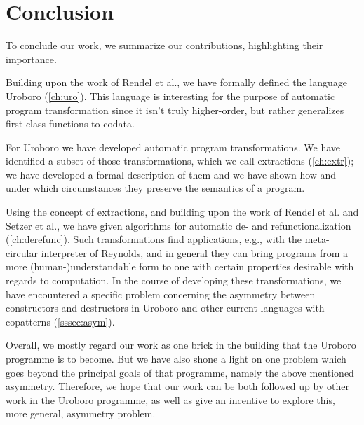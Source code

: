 \chapter{Conclusion}
\label{ch:concl}

To conclude our work, we summarize our contributions, highlighting their importance.

Building upon the work of Rendel et al., we have formally defined the language Uroboro (\autoref{ch:uro}). This language is interesting for the purpose of automatic program transformation since it isn't truly higher-order, but rather generalizes first-class functions to codata.

For Uroboro we have developed automatic program transformations. We have identified a subset of those transformations, which we call extractions (\autoref{ch:extr}); we have developed a formal description of them and we have shown how and under which circumstances they preserve the semantics of a program.

Using the concept of extractions, and building upon the work of Rendel et al. and Setzer et al., we have given algorithms for automatic de- and refunctionalization (\autoref{ch:derefunc}). Such transformations find applications, e.g., with the meta-circular interpreter of Reynolds, and in general they can bring programs from a more (human-)understandable form to one with certain properties desirable with regards to computation. In the course of developing these transformations, we have encountered a specific problem concerning the asymmetry between constructors and destructors in Uroboro and other current languages with copatterns (\autoref{sssec:asym}).

Overall, we mostly regard our work as one brick in the building that the Uroboro programme is to become. But we have also shone a light on one problem which goes beyond the principal goals of that programme, namely the above mentioned asymmetry. Therefore, we hope that our work can be both followed up by other work in the Uroboro programme, as well as give an incentive to explore this, more general, asymmetry problem.